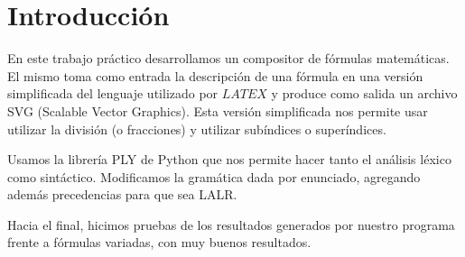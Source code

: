 \section{Introducción}
En este trabajo práctico desarrollamos un compositor de fórmulas
matemáticas. El mismo toma como entrada la descripción de una fórmula
en una versión simplificada del lenguaje utilizado por $LATEX$ y produce como salida un archivo SVG (Scalable Vector Graphics).
Esta versión simplificada nos permite usar utilizar la división (o fracciones) y utilizar subíndices o superíndices.

Usamos la librería PLY \cite{ply} de Python que nos permite hacer tanto el análisis léxico como sintáctico. Modificamos la gramática dada por enunciado, agregando además precedencias para que sea LALR.

Hacia el final, hicimos pruebas de los resultados generados por nuestro programa frente a fórmulas variadas, con muy buenos resultados.